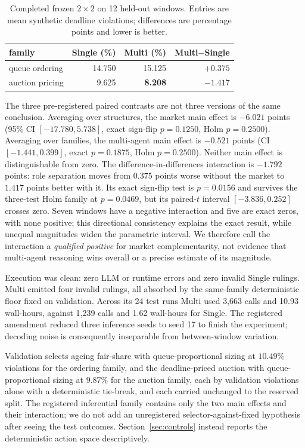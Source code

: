 \documentclass[conference]{IEEEtran}
\begin{document}
\begin{table}[t]
\caption{Completed frozen $2\times2$ on 12 held-out windows.  Entries are mean synthetic deadline
violations; differences are percentage points and lower is better.}
\label{tab:structures}
\centering
\small
\begin{tabular}{lrrr}
\toprule
family & Single (\%) & Multi (\%) & Multi$-$Single \\
\midrule
queue ordering & 14.750 & 15.125 & $+0.375$ \\
auction pricing & 9.625 & \textbf{8.208} & $\mathbf{-1.417}$ \\
\bottomrule
\end{tabular}
\end{table}

The three pre-registered paired contrasts are not three versions of the same conclusion.  Averaging
over structures, the market main effect is $-6.021$ points (95\% CI $[-17.780,5.738]$, exact sign-flip
$p=0.1250$, Holm $p=0.2500$).  Averaging over families, the multi-agent main effect is $-0.521$
points (CI $[-1.441,0.399]$, exact $p=0.1875$, Holm $p=0.2500$).  Neither main effect is distinguishable
from zero.  The difference-in-differences interaction is $-1.792$ points: role separation moves from
$0.375$ points worse without the market to $1.417$ points better with it.  Its exact sign-flip test is
$p=0.0156$ and survives the three-test Holm family at $p=0.0469$, but its paired-$t$ interval
$[-3.836,0.252]$ crosses zero.  Seven windows have a negative interaction and five are exact zeros,
with none positive; this directional consistency explains the exact result, while unequal magnitudes
widen the parametric interval.  We therefore call the interaction a \emph{qualified positive} for
market complementarity, not evidence that multi-agent reasoning wins overall or a precise estimate of
its magnitude.

Execution was clean: zero LLM or runtime errors and zero invalid Single rulings.  Multi emitted four
invalid rulings, all absorbed by the same-family deterministic floor fixed on validation.  Across its
24 test runs Multi used 3,663 calls and 10.93 wall-hours, against 1,239 calls and 1.62 wall-hours for
Single.  The registered amendment reduced three inference seeds to seed 17 to finish the experiment;
decoding noise is consequently inseparable from between-window variation.

Validation selects ageing fair-share with queue-proportional sizing at $10.49\%$ violations for the
ordering family, and the deadline-priced auction with queue-proportional sizing at $9.87\%$ for the
auction family, each by validation violations alone with a deterministic tie-break, and each carried
unchanged to the reserved split.  The registered inferential family contains only the two main effects
and their interaction; we do not add an unregistered selector-against-fixed hypothesis after seeing the
test outcomes.  Section~\ref{sec:controls} instead reports the deterministic action space descriptively.
\end{document}
